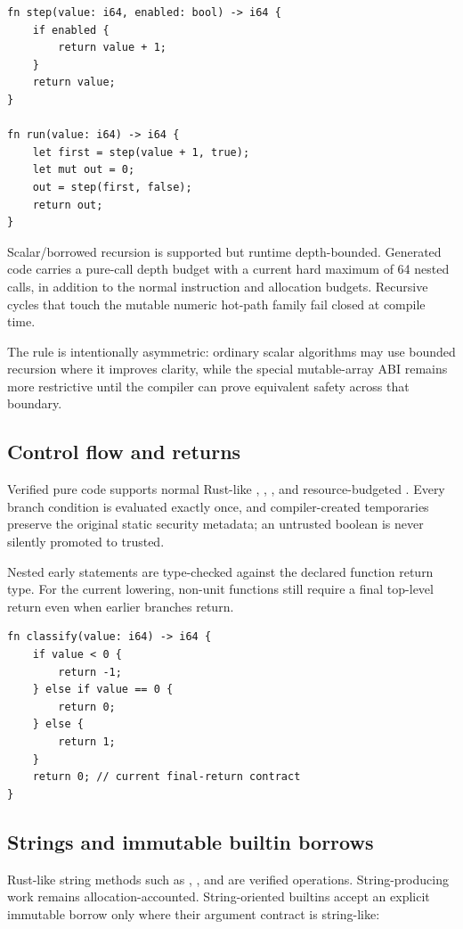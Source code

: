 \begin{lstlisting}[language=Velran]
fn step(value: i64, enabled: bool) -> i64 {
    if enabled {
        return value + 1;
    }
    return value;
}

fn run(value: i64) -> i64 {
    let first = step(value + 1, true);
    let mut out = 0;
    out = step(first, false);
    return out;
}
\end{lstlisting}

Scalar/borrowed recursion is supported but runtime depth-bounded. Generated code carries a pure-call depth budget with a current hard maximum of 64 nested calls, in addition to the normal instruction and allocation budgets. Recursive cycles that touch the mutable numeric hot-path family fail closed at compile time.

The rule is intentionally asymmetric: ordinary scalar algorithms may use bounded recursion where it improves clarity, while the special mutable-array ABI remains more restrictive until the compiler can prove equivalent safety across that boundary.

\subsection*{Control flow and returns}

Verified pure code supports normal Rust-like , , , and resource-budgeted . Every branch condition is evaluated exactly once, and compiler-created temporaries preserve the original static security metadata; an untrusted boolean is never silently promoted to trusted.

Nested early  statements are type-checked against the declared function return type. For the current lowering, non-unit functions still require a final top-level return even when earlier branches return.

\begin{lstlisting}[language=Velran]
fn classify(value: i64) -> i64 {
    if value < 0 {
        return -1;
    } else if value == 0 {
        return 0;
    } else {
        return 1;
    }
    return 0; // current final-return contract
}
\end{lstlisting}

\subsection*{Strings and immutable builtin borrows}

Rust-like string methods such as , , and  are verified operations. String-producing work remains allocation-accounted. String-oriented builtins accept an explicit immutable borrow only where their argument contract is string-like:

